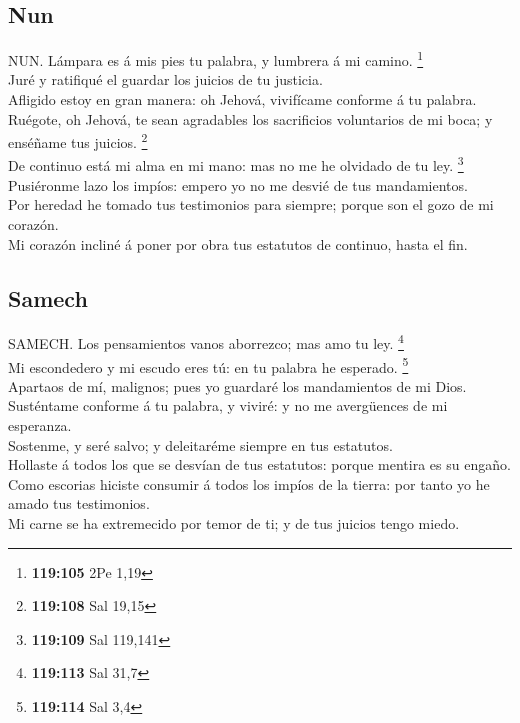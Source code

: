 \hypertarget{nun}{%
\subsection{Nun}\label{nun}}

 NUN. Lámpara es á mis pies tu palabra, y lumbrera á mi
camino. \footnote{\textbf{119:105} 2Pe 1,19}\\
 Juré y ratifiqué el guardar los juicios de tu
justicia.\\
 Afligido estoy en gran manera: oh Jehová, vivifícame
conforme á tu palabra.\\
 Ruégote, oh Jehová, te sean agradables los sacrificios
voluntarios de mi boca; y enséñame tus juicios. \footnote{\textbf{119:108}
  Sal 19,15}\\
 De continuo está mi alma en mi mano: mas no me he
olvidado de tu ley. \footnote{\textbf{119:109} Sal 119,141}\\
 Pusiéronme lazo los impíos: empero yo no me desvié de
tus mandamientos.\\
 Por heredad he tomado tus testimonios para siempre;
porque son el gozo de mi corazón.\\
 Mi corazón incliné á poner por obra tus estatutos de
continuo, hasta el fin.

\hypertarget{samech}{%
\subsection{Samech}\label{samech}}

 SAMECH. Los pensamientos vanos aborrezco; mas amo tu
ley. \footnote{\textbf{119:113} Sal 31,7}\\
 Mi escondedero y mi escudo eres tú: en tu palabra he
esperado. \footnote{\textbf{119:114} Sal 3,4}\\
 Apartaos de mí, malignos; pues yo guardaré los
mandamientos de mi Dios.\\
 Susténtame conforme á tu palabra, y viviré: y no me
avergüences de mi esperanza.\\
 Sostenme, y seré salvo; y deleitaréme siempre en tus
estatutos.\\
 Hollaste á todos los que se desvían de tus estatutos:
porque mentira es su engaño.\\
 Como escorias hiciste consumir á todos los impíos de la
tierra: por tanto yo he amado tus testimonios.\\
 Mi carne se ha extremecido por temor de ti; y de tus
juicios tengo miedo.

